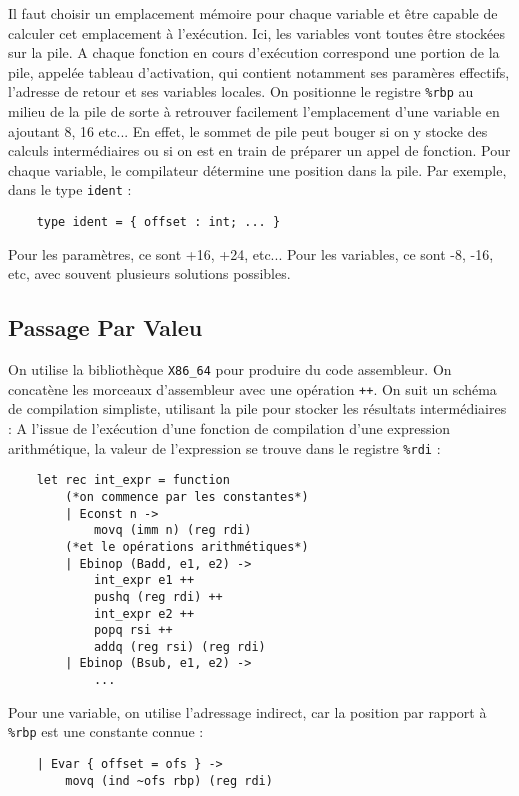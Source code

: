 \documentclass{cours}
\begin{document}
Il faut choisir un emplacement mémoire pour chaque variable et être capable de calculer cet emplacement à l'exécution. Ici, les variables vont toutes être stockées sur la pile. A chaque fonction en cours d'exécution correspond une portion de la pile, appelée tableau d'activation, qui contient notamment ses paramères effectifs, l'adresse de retour et ses variables locales. On positionne le registre \texttt{\%rbp} au milieu de la pile de sorte à retrouver facilement l'emplacement d'une variable en ajoutant 8, 16 etc... En effet, le sommet de pile peut bouger si on y stocke des calculs intermédiaires ou si on est en train de préparer un appel de fonction. Pour chaque variable, le compilateur détermine une position dans la pile. Par exemple, dans le type \texttt{ident} :
\begin{verbatim}
    type ident = { offset : int; ... }    
\end{verbatim}
Pour les paramètres, ce sont +16, +24, etc... Pour les variables, ce sont -8, -16, etc, avec souvent plusieurs solutions possibles.

\subsection{Passage Par Valeu}
On utilise la bibliothèque \texttt{X86\_64} pour produire du code assembleur. On concatène les morceaux d'assembleur avec une opération \texttt{++}. On suit un schéma de compilation simpliste, utilisant la pile pour stocker les résultats intermédiaires : A l'issue de l'exécution d'une fonction de compilation d'une expression arithmétique, la valeur de l'expression se trouve dans le registre \texttt{\%rdi} :
\begin{verbatim}
    let rec int_expr = function
        (*on commence par les constantes*)
        | Econst n ->
            movq (imm n) (reg rdi)
        (*et le opérations arithmétiques*)
        | Ebinop (Badd, e1, e2) ->
            int_expr e1 ++
            pushq (reg rdi) ++
            int_expr e2 ++
            popq rsi ++
            addq (reg rsi) (reg rdi)
        | Ebinop (Bsub, e1, e2) ->
            ...
\end{verbatim}

Pour une variable, on utilise l'adressage indirect, car la position par rapport à \texttt{\%rbp} est une constante connue :
\begin{verbatim}
    | Evar { offset = ofs } ->
        movq (ind ~ofs rbp) (reg rdi)
\end{verbatim}
\end{document}
